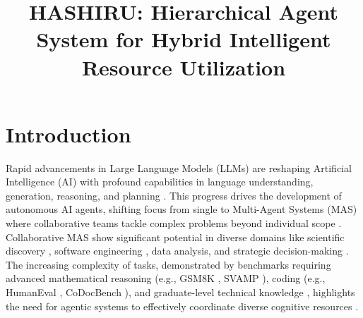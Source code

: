 \documentclass[conference]{IEEEtran}
\begin{document}
\title{HASHIRU: Hierarchical Agent System for Hybrid Intelligent Resource Utilization}

\author{
\and
{}
\and
{}
\and
{}
}

\maketitle

\section{Introduction}\label{sec:introduction}

Rapid advancements in Large Language Models (LLMs) are reshaping Artificial Intelligence (AI) with profound capabilities in language understanding, generation, reasoning, and planning \cite{brown2020language, devlin2019bert, raffel2020exploring}. This progress drives the development of autonomous AI agents, shifting focus from single to Multi-Agent Systems (MAS) where collaborative teams tackle complex problems beyond individual scope \cite{dorri2018multi, wooldridge2009introduction}. Collaborative MAS show significant potential in diverse domains like scientific discovery \cite{boiko2023emergent}, software engineering \cite{qian2023communicative}, data analysis, and strategic decision-making \cite{wang2023decision}. The increasing complexity of tasks, demonstrated by benchmarks requiring advanced mathematical reasoning (e.g., GSM8K \cite{cobbe2021gsm8k}, SVAMP \cite{patel2021svamp}), coding (e.g., HumanEval \cite{chen2021codex}, CoDocBench \cite{pai2024codocbench}), and graduate-level technical knowledge \cite{phan2025humanitysexam}, highlights the need for agentic systems to effectively coordinate diverse cognitive resources \cite{wen2024benchmarkingcomplexinstructionfollowingmultiple}.
\end{document}
